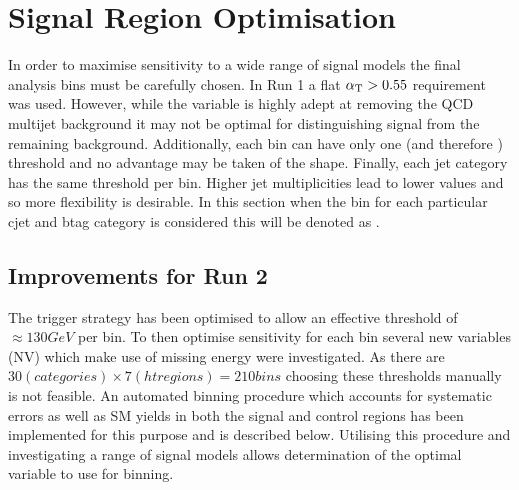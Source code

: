 
\chapter{Signal Region Optimisation} %

\label{Chapter5} %



In order to maximise sensitivity to a wide range of signal models the final analysis bins must be carefully chosen. In Run 1 a flat $\alpha_{\text{T}} > 0.55$ requirement was used. However, while the \alphat variable is highly adept at removing the QCD multijet background it may not be optimal for distinguishing signal from the remaining background. Additionally, each bin can have only one \alphat (and therefore \mht) threshold and no advantage may be taken of the shape. Finally, each jet category has the same \alphat threshold per \scalht bin. Higher jet multiplicities lead to lower \alphat values and so more flexibility is desirable. In this section when the \scalht bin for each particular cjet and btag category is considered this will be denoted as \scalhtcat.


\section{Improvements for Run 2}

The trigger strategy has been optimised to allow an effective \mht threshold of $\approx 130GeV$ per bin. To then optimise sensitivity for each \scalhtcat bin several new variables (NV) which make use of missing energy were investigated. As there are $30 (categories) \times7 (ht regions) = 210 bins$ choosing these thresholds manually is not feasible. An automated binning procedure which accounts for systematic errors as well as SM yields in both the signal and control regions has been implemented for this purpose and is described below. Utilising this procedure and investigating a range of signal models allows determination of the optimal variable to use for binning.          

